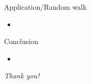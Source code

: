 \documentclass[%
    slidestop,%
    compress,%
    mathserif,%
    table,%
    usenames,%
    aspectratio=169,
    dvipsnames,%
]{beamer}%
\begin{document}
\begin{frame}{Application/Random walk}
    \begin{itemize}
        \item 
    \end{itemize}
\end{frame}

\begin{frame}{Conclusion}
    \begin{itemize}
        \item 
    \end{itemize}
\end{frame}

\begin{frame}[c]{ }
    \centering 
    \Huge
    \emph{Thank you!} \\
    \vspace{0.5em}
    \normalsize
    \color{black}{https://robostar.cs.york.ac.uk/}
\end{frame}

\newpage
%

 
\label{ch:bib} %
\end{document}
